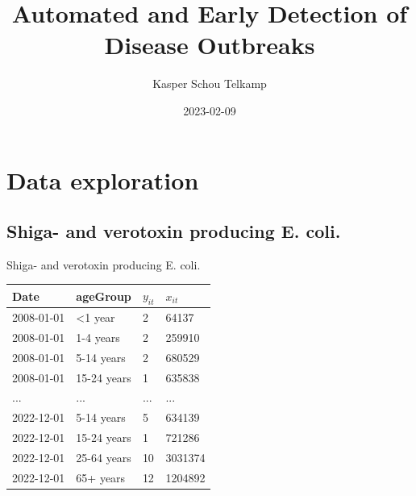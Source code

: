 \documentclass[aspectratio=169]{beamer}
\title[Automated and Early Detection of Disease Outbreaks]{Automated and
Early Detection of Disease Outbreaks}
\author{Kasper Schou Telkamp}
\institute{Section for Dynamical Systems}
\date{2023-02-09}
\begin{document}
\frame{
	\maketitle
}


\hypertarget{data-exploration}{%
\section{Data exploration}\label{data-exploration}}

\hypertarget{shiga--and-verotoxin-producing-e.-coli.}{%
\subsection{Shiga- and verotoxin producing E.
coli.}\label{shiga--and-verotoxin-producing-e.-coli.}}

\begin{frame}{Shiga- and verotoxin producing E. coli.}
\tiny

\begin{table}
\centering\begingroup\fontsize{12}{14}\selectfont

\begin{tabular}{llll}
\toprule
Date & ageGroup & $y_{it}$ & $x_{it}$\\
\midrule
2008-01-01 & <1 year & 2 & 64137\\
2008-01-01 & 1-4 years & 2 & 259910\\
2008-01-01 & 5-14 years & 2 & 680529\\
2008-01-01 & 15-24 years & 1 & 635838\\
... & ... & ... & ...\\
2022-12-01 & 5-14 years & 5 & 634139\\
2022-12-01 & 15-24 years & 1 & 721286\\
2022-12-01 & 25-64 years & 10 & 3031374\\
2022-12-01 & 65+ years & 12 & 1204892\\
\bottomrule
\end{tabular}
\endgroup{}
\end{table}

\normalsize
\end{frame}
\end{document}
